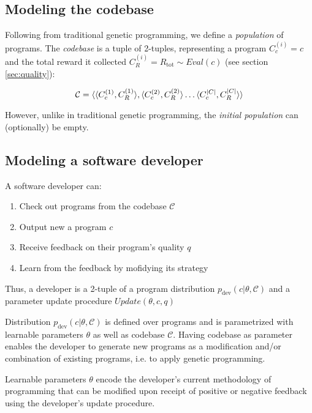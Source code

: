 \subsection{Modeling the codebase}

Following from traditional genetic programming, we define a \emph{population} of programs. 
The \emph{codebase} is a tuple of 2-tuples, representing a program $C_c^{(i)}=c$ and the total reward it collected $C_R^{(i)}=R_\text{tot} \sim \mathit{Eval}(c)$ (see section \ref{sec:quality}):

\begin{equation}
    \mathcal{C} = \langle \langle C_c^{(1)}, C_R^{(1)} \rangle, \langle C_c^{(2)}, C_R^{(2)} \rangle \dots \langle C_c^{|C|}, C_R^{|C|} \rangle \rangle
\end{equation}

However, unlike in traditional genetic programming, the \emph{initial population} can (optionally) be empty.

\subsection{Modeling a software developer}
\label{sec:developer}


A software developer can:
\begin{enumerate}
    \item Check out programs from the codebase $\mathcal{C}$
    \item Output new a program $c$
    \item Receive feedback on their program's quality $q$ 
    \item Learn from the feedback by mofidying its strategy
\end{enumerate}

Thus, a developer is a 2-tuple of a program distribution $p_\text{dev}(c | \theta, \mathcal{C})$ and a parameter update procedure $\mathit{Update}(\theta, c, q)$

Distribution $p_{\text{dev}}(c | \theta, \mathcal{C})$ is defined over programs and is parametrized with learnable parameters $\theta$ as well as codebase $\mathcal{C}$. 
Having codebase as parameter enables the developer to generate new programs as a modification and/or combination of existing programs, i.e. to apply genetic programming.

Learnable parameters $\theta$ encode the developer's current methodology of programming that can be modified upon receipt of positive or negative feedback using the developer's update procedure. 

